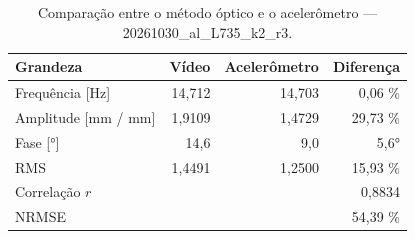 \begin{table}[htbp]
  \centering
  \caption{Comparação entre o método óptico e o acelerômetro — 20261030\_al\_L735\_k2\_r3.}
  \label{tab:comp_20261030_al_L735_k2_r3}
  \begin{tabular}{lrrr}
    \toprule
    Grandeza & Vídeo & Acelerômetro & Diferença \\
    \midrule
    Frequência [Hz] & 14{,}712 & 14{,}703 & 0{,}06 \% \\
    Amplitude [mm / mm] & 1{,}9109 & 1{,}4729 & 29{,}73 \% \\
    Fase [°] & 14{,}6 & 9{,}0 & 5{,}6° \\
    RMS & 1{,}4491 & 1{,}2500 & 15{,}93 \% \\
    Correlação $r$ &  &  & 0{,}8834 \\
    NRMSE &  &  & 54{,}39 \% \\
    \bottomrule
  \end{tabular}
\end{table}
